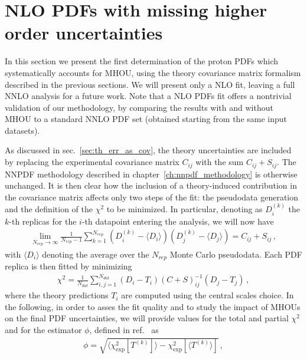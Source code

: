     
    \section{NLO PDFs with missing higher order uncertainties}
    \label{sec:th_error_results}
    In this section we present the first determination of the proton PDFs 
    which systematically accounts for MHOU,
    using the theory covariance matrix formalism described in the previous sections.
    We will present only a NLO fit, leaving a full NNLO analysis for a future work.
    Note that a NLO PDFs fit offers a nontrivial validation of our methodology, by comparing the results with and without MHOU to 
    a standard NNLO PDF set (obtained starting from the same input datasets).

    As discussed in sec.~\ref{sec:th_err_as_cov}, the theory uncertainties are included by replacing the
    experimental covariance matrix $C_{ij}$ with the sum $C_{ij}+S_{ij}$. The NNPDF methodology 
    described in chapter~\ref{ch:nnpdf_methodology} is otherwise unchanged.
    It is then clear how the inclusion of a theory-induced contribution in the covariance matrix affects only two steps
    of the fit: the pseudodata generation and the definition of the $\chi^2$ to be minimized.
    In particular, denoting as $D_i^{(k)}$ the $k$-th replicas for the $i$-th datapoint entering the analysis,
    we will now have
    \begin{align}
        \lim_{N_{rep}\rightarrow \infty}\frac{1}{N_{rep}-1}
        \sum_{k=1}^{N_{rep}}\left(D_i^{(k)}-\langle D_i \rangle\right)\left(D_j^{(k)}-\langle D_j \rangle\right)
        = C_{ij} + S_{ij}\,,
    \end{align}
    with $\langle D_i \rangle$ denoting the average over the $N_{rep}$ Monte Carlo pseudodata.
    Each PDF replica is then fitted by minimizing 
    \begin{align}
        \chi^2 = \frac{1}{N_{dat}}\sum_{i,j=1}^{N_{dat}}
        \left(D_i - T_i\right)\left(C+S\right)_{ij}^{-1}\left(D_j-T_j\right)\,,
    \end{align}
    where the theory predictions $T_i$ are computed using the central scales choice.
    In the following, in order to asses the fit quality and to study the impact of MHOUs on the final
    PDF uncertainties, we will provide values for the total and partial $\chi^2$ and for the estimator
    $\phi$, defined in ref.~\cite{Ball:2014uwa} as
    \begin{align}
        \label{eq:phi}
        \phi = \sqrt{\langle \chi^2_{\text{exp}}\left[T^{(k)}\right] \rangle 
        - \chi^2_{\text{exp}}\left[\langle T^{(k)} \rangle\right]}\,,
    \end{align}
